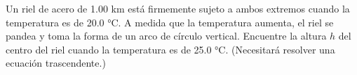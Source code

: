 \item Un riel de acero de 1.00 km está firmemente sujeto a ambos extremos cuando la temperatura es de 20.0 °C. A medida que la temperatura aumenta, el riel se pandea y toma la forma de un arco de círculo vertical. Encuentre la altura $h$ del centro del riel cuando la temperatura es de 25.0 °C. (Necesitará resolver una ecuación trascendente.)

